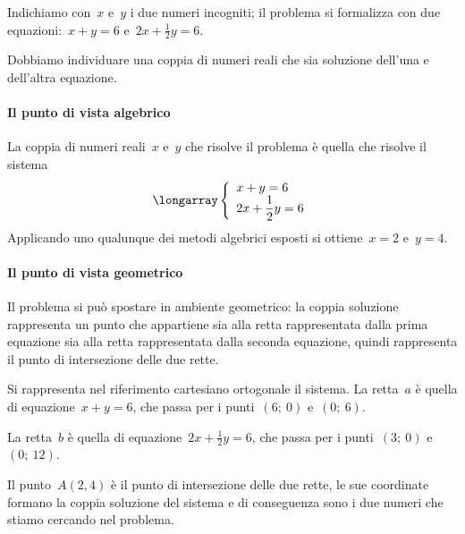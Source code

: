  \begin{soluzione}
Indichiamo con~$x$ e~$y$ i due numeri incogniti; il problema si formalizza
con due equazioni:~$x+y=6$ e~$2x+\frac{1}{2}y=6$.

Dobbiamo individuare una coppia di numeri reali che sia soluzione
dell'una e dell'altra equazione.

\paragraph{Il punto di vista algebrico}
La coppia di numeri reali~$x$ e~$y$ che risolve il problema è quella che
risolve il sistema
\[\longarray\left\{\begin{array}{l}x+y=6\\2x+\dfrac{1}{2}y=6 
\end{array}\right.\]
Applicando uno qualunque dei metodi algebrici esposti si ottiene~$x=2$ e~$y=4$.

\paragraph{Il punto di vista geometrico}

Il problema si può spostare in ambiente geometrico: la coppia
soluzione rappresenta un punto che appartiene sia alla retta
rappresentata dalla prima equazione sia alla retta rappresentata dalla
seconda equazione, quindi rappresenta il punto di intersezione delle due rette.

Si rappresenta nel riferimento cartesiano ortogonale il sistema.
La retta~$a$ è quella di equazione~$x+y=6$, che passa per i
punti~$(6;~0)$ e~$(0;~6)$.

La retta~$b$ è quella di equazione~$2x+\frac{1}{2}y=6$, che
passa per i punti~$(3;~0)$ e~$(0;~12)$.

Il punto~$A(2,4)$ è il punto di intersezione delle due rette, le sue
coordinate formano la coppia soluzione del sistema e di conseguenza
sono i due numeri che stiamo cercando nel problema.

\begin{center}
\begin{inaccessibleblock}
 
\end{inaccessibleblock}
\end{center}
 \end{soluzione}

